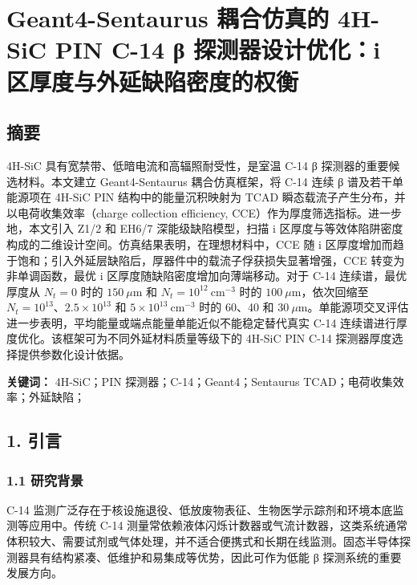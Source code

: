 \documentclass[
  10pt,
  a4paper,
]{ctexart}
\author{}
\date{}
\begin{document}
\section{Geant4-Sentaurus 耦合仿真的 4H-SiC PIN C-14 β 探测器设计优化：i
区厚度与外延缺陷密度的权衡}\label{geant4-sentaurus-ux8026ux5408ux4effux771fux7684-4h-sic-pin-c-14-ux3b2-ux63a2ux6d4bux5668ux8bbeux8ba1ux4f18ux5316i-ux533aux539aux5ea6ux4e0eux5916ux5ef6ux7f3aux9677ux5bc6ux5ea6ux7684ux6743ux8861}

\subsection{摘要}\label{ux6458ux8981}

4H-SiC 具有宽禁带、低暗电流和高辐照耐受性，是室温 C-14 β
探测器的重要候选材料。本文建立 Geant4-Sentaurus 耦合仿真框架，将 C-14
连续 β 谱及若干单能源项在 4H-SiC PIN 结构中的能量沉积映射为 TCAD
瞬态载流子产生分布，并以电荷收集效率（charge collection efficiency,
CCE）作为厚度筛选指标。进一步地，本文引入 Z1/2 和 EH6/7
深能级缺陷模型，扫描 i
区厚度与等效体陷阱密度构成的二维设计空间。仿真结果表明，在理想材料中，CCE
随 i
区厚度增加而趋于饱和；引入外延层缺陷后，厚器件中的载流子俘获损失显著增强，CCE
转变为非单调函数，最优 i 区厚度随缺陷密度增加向薄端移动。对于 C-14
连续谱，最优厚度从 \(N_t=0\) 时的 \(150\ \mu\mathrm{m}\) 和
\(N_t=10^{12}\ \mathrm{cm^{-3}}\) 时的
\(100\ \mu\mathrm{m}\)，依次回缩至 \(N_t=10^{13}\)、\(2.5\times10^{13}\)
和 \(5\times10^{13}\ \mathrm{cm^{-3}}\) 时的 60、40 和
\(30\ \mu\mathrm{m}\)。单能源项交叉评估进一步表明，平均能量或端点能量单能近似不能稳定替代真实
C-14 连续谱进行厚度优化。该框架可为不同外延材料质量等级下的 4H-SiC PIN
C-14 探测器厚度选择提供参数化设计依据。

\textbf{关键词：} 4H-SiC；PIN 探测器；C-14；Geant4；Sentaurus
TCAD；电荷收集效率；外延缺陷；

\subsection{1. 引言}\label{ux5f15ux8a00}

\subsubsection{1.1 研究背景}\label{ux7814ux7a76ux80ccux666f}

C-14
监测广泛存在于核设施退役、低放废物表征、生物医学示踪剂和环境本底监测等应用中。传统
C-14
测量常依赖液体闪烁计数器或气流计数器，这类系统通常体积较大、需要试剂或气体处理，并不适合便携式和长期在线监测。固态半导体探测器具有结构紧凑、低维护和易集成等优势，因此可作为低能
β 探测系统的重要发展方向。
\end{document}
